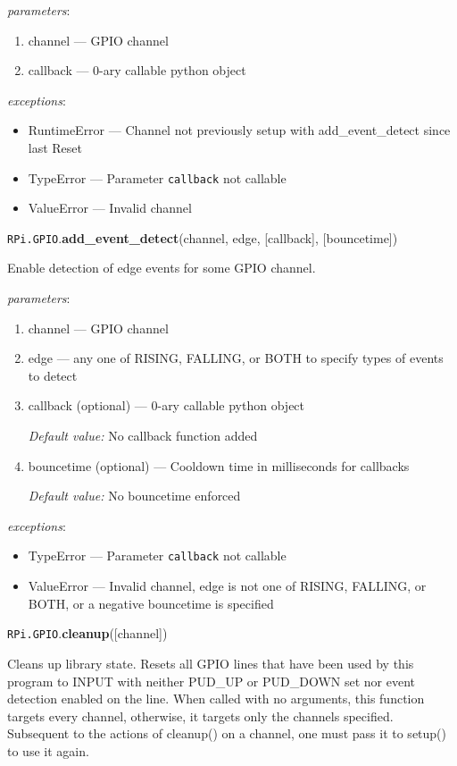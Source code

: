 \documentclass[12pt]{article}
\begin{document}

\textit{parameters}:
\begin{enumerate}
    \item channel --- GPIO channel
    \item callback --- 0-ary callable python object
\end{enumerate}

\textit{exceptions}:
\begin{itemize}
    \item RuntimeError --- Channel not previously setup with add\_event\_detect since last Reset
    \item TypeError --- Parameter \texttt{callback} not callable
    \item ValueError --- Invalid channel
\end{itemize}


\noindent \texttt{RPi.GPIO}.\textbf{add\_event\_detect}(channel, edge, [callback], [bouncetime])

Enable detection of edge events for some GPIO channel.

\textit{parameters}:
\begin{enumerate}
    \item channel --- GPIO channel
    \item edge --- any one of RISING, FALLING, or BOTH to specify types of events to detect
    \item callback (optional) --- 0-ary callable python object
    
    \textit{Default value:} No callback function added
    \item bouncetime (optional) --- Cooldown time in milliseconds for callbacks

    \textit{Default value:} No bouncetime enforced
\end{enumerate}

\textit{exceptions}:
\begin{itemize}
    \item TypeError --- Parameter \texttt{callback} not callable
    \item ValueError --- Invalid channel, edge is not one of RISING, FALLING, or BOTH,  or a negative bouncetime is specified
\end{itemize}

\noindent \texttt{RPi.GPIO}.\textbf{cleanup}([channel])

Cleans up library state. Resets all GPIO lines that have been used by this program to INPUT with neither PUD\_UP or PUD\_DOWN set nor event detection enabled on the line. When called with no arguments, this function targets every channel, otherwise, it targets only the channels specified. Subsequent to the actions of cleanup() on a channel, one must pass it to setup() to use it again.
\end{document}
